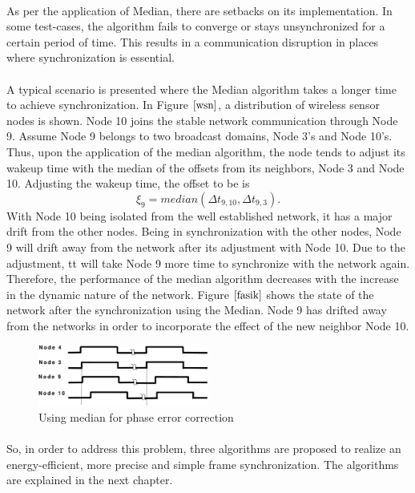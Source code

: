 \documentclass[a4paper,10pt]{report}
\begin{document}
\paragraph*{} \noindent 
As per the application of Median, there are setbacks on its implementation. In some test-cases, the algorithm fails to converge or stays unsynchronized for a certain period of time. This results in a  communication disruption in places where synchronization is essential.
\paragraph*{} A typical scenario is presented where the Median algorithm takes a longer time to achieve synchronization. In Figure
$\ref{wsn}$, a distribution of wireless sensor nodes is shown. Node 10 joins the stable network communication through Node 9. Assume Node 9 belongs to two broadcast domains, Node 3's and Node 10's. Thus, upon the application of the median algorithm, the node tends to
adjust its wakeup time with the median of the offsets from its neighbors, Node 3 and Node 10. Adjusting the wakeup time, the offset to be is
\begin{equation}
\xi_9 = median(\Delta t_{9,10} , \Delta t_{9,3}).
\end{equation}
With Node 10 being isolated from the well established network, it has a major drift from the other nodes. Being in synchronization
with the other nodes, Node 9 will drift away from the network after its adjustment with Node 10. Due to the adjustment, tt will take Node 9 more time to synchronize with the network again. Therefore, the performance of the median algorithm decreases with the increase in the dynamic nature of the network. Figure $\ref{fasik}$ shows the state of the network after the synchronization using the Median. Node 9 has drifted away from the networks in order to incorporate the effect of the new neighbor Node 10.
\begin{figure}
\centering
\includegraphics[width= 0.5\textwidth]{offsetpic}
\caption{Using median for phase error correction} \label{fasik}
\end{figure}
\paragraph*{}
So, in order to address this problem, three algorithms are proposed to realize an energy-efficient, more precise and simple frame synchronization. The algorithms are explained in the next chapter.
\end{document}
